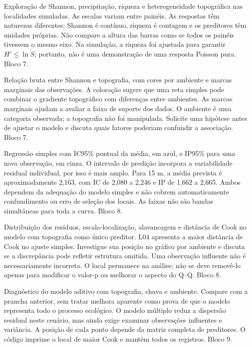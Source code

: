{Exploração de Shannon, precipitação, riqueza e heterogeneidade topográfica nas localidades simuladas. As escalas variam entre painéis.}
{As respostas têm naturezas diferentes: Shannon é contínuo, riqueza é contagem e os preditores têm unidades próprias. Não compare a altura das barras como se todos os painéis tivessem o mesmo eixo. Na simulação, a riqueza foi ajustada para garantir $H'\leq\ln S$; portanto, não é uma demonstração de uma resposta Poisson pura. Bloco 7.}

{Relação bruta entre Shannon e topografia, com cores por ambiente e marcas marginais das observações.}
{A coloração sugere que uma reta simples pode combinar o gradiente topográfico com diferenças entre ambientes. As marcas marginais ajudam a avaliar a faixa de suporte dos dados. O ambiente é uma categoria observada; a topografia não foi manipulada. Solicite uma hipótese antes de ajustar o modelo e discuta quais fatores poderiam confundir a associação. Bloco 7.}

{Regressão simples com IC95\% pontual da média, em azul, e IP95\% para uma nova observação, em cinza.}
{O intervalo de predição incorpora a variabilidade residual individual, por isso é mais amplo. Para 15 m, a média prevista é aproximadamente 2,163, com IC de 2,080 a 2,246 e IP de 1,662 a 2,665. Ambos dependem da adequação do modelo simples e não cobrem automaticamente confundimento ou erro de seleção dos locais. As faixas não são bandas simultâneas para toda a curva. Bloco 8.}

{Distribuição dos resíduos, escala-localização, alavancagem e distância de Cook no modelo com topografia como único preditor.}
{L04 apresenta a maior distância de Cook no ajuste simples. Investigue sua posição no gráfico por ambiente e discuta se a discrepância pode refletir estrutura omitida. Uma observação influente não é necessariamente incorreta. O local permanece na análise; não se deve removê-lo apenas para modificar o valor-p ou melhorar o aspecto do Q--Q. Bloco 8.}

{Diagnóstico do modelo aditivo com topografia, chuva e ambiente.}
{Compare com a prancha anterior, sem tratar melhora aparente como prova de que o modelo representa todo o processo ecológico. O modelo múltiplo reduz a dispersão residual neste cenário, mas ainda exige examinar observações influentes e variância. A posição de cada ponto depende da matriz completa de preditores. O código imprime o local de maior Cook e mantém todos os registros. Bloco 9.}


